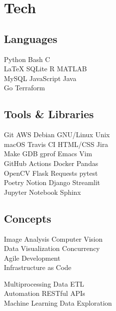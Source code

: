 \documentclass[]{jidicula-resume}
\begin{document}
\section{Tech}
\begin{minipage}[t]{.32\textwidth}
  \subsection{Languages}
  Python \textbullet{} Bash \textbullet{} C \\
  \LaTeX{} \textbullet{} SQLite \textbullet{} R \textbullet{} MATLAB  \\
  MySQL \textbullet{} JavaScript \textbullet{} Java \\
  Go \textbullet{} Terraform
  \sectionsep{}
\end{minipage}
\hfill
\begin{minipage}[t]{.32\textwidth}
  \subsection{Tools \& Libraries}
  Git \textbullet{} AWS \textbullet{} {Debian GNU/Linux} \textbullet{} Unix \\
  macOS \textbullet{} Travis CI \textbullet{} HTML/CSS \textbullet{} Jira \\
  Make \textbullet{} GDB \textbullet{} gprof \textbullet{} Emacs \textbullet{} Vim \\
  GitHub Actions \textbullet{} Docker \textbullet{} Pandas \\
  OpenCV \textbullet{} Flask \textbullet{} Requests \textbullet{} pytest \\
  Poetry \textbullet{} Notion \textbullet{} Django \textbullet{} Streamlit \\
  Jupyter Notebook \textbullet{} Sphinx
  \sectionsep{}
\end{minipage}
\hfill
\begin{minipage}[t]{.32\textwidth}
  \subsection{Concepts}
  Image Analysis \textbullet{} Computer Vision \\
  Data Visualization \textbullet{} Concurrency \\
  Agile Development \\
  Infrastructure as Code
  
  Multiprocessing \textbullet{} Data ETL \\
  Automation \textbullet{}  RESTful APIs \\
  Machine Learning \textbullet{} Data Exploration
  \sectionsep{}
\end{minipage}
\end{document}
